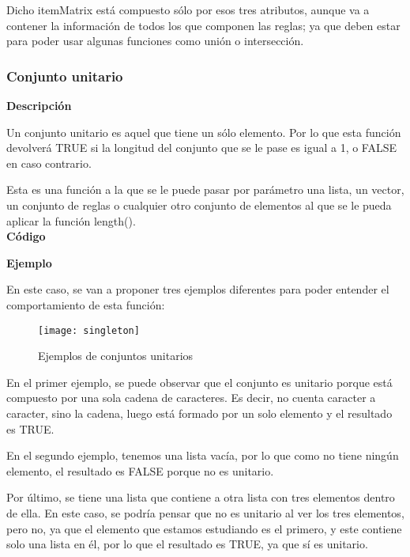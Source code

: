     Dicho itemMatrix est\'a compuesto s\'olo por esos tres atributos, aunque va a contener la informaci\'on de todos los que 
    componen las reglas; ya que deben estar para poder usar algunas funciones como uni\'on o intersecci\'on.



\subsubsection{Conjunto unitario}

    \textbf{Descripci\'on}
    
    Un conjunto unitario es aquel que tiene un s\'olo elemento. Por lo que esta funci\'on 
    devolver\'a TRUE si la longitud del conjunto que se le pase es igual a 1, o FALSE en caso 
    contrario.

    Esta es una funci\'on a la que se le puede pasar por par\'ametro una lista, un vector, 
    un conjunto de reglas o cualquier otro conjunto de elementos al que se le pueda aplicar la funci\'on 
    length().
    \\


    \textbf{C\'odigo}

    
    \bigskip

    \textbf{Ejemplo}

    En este caso, se van a proponer tres ejemplos diferentes para poder entender el comportamiento de esta funci\'on:

    \begin{figure}[H]
        \centering
        \texttt{[image: singleton]}
        \caption{Ejemplos de conjuntos unitarios}
        \label{fig:singleton}
    \end{figure}

    En el primer ejemplo, se puede observar que el conjunto es unitario porque est\'a compuesto por una sola cadena de caracteres. 
    Es decir, no cuenta caracter a caracter, sino la cadena, luego est\'a formado por un solo elemento y el resultado es TRUE.

    En el segundo ejemplo, tenemos una lista vac\'ia, por lo que como no tiene ning\'un elemento, el resultado es FALSE porque no es unitario.

    Por \'ultimo, se tiene una lista que contiene a otra lista con tres elementos dentro de ella. En este caso, se podr\'ia pensar que 
    no es unitario al ver los tres elementos, pero no, ya que el elemento que estamos estudiando es el primero, y este contiene solo una lista 
    en \'el, por lo que el resultado es TRUE, ya que s\'i es unitario.



